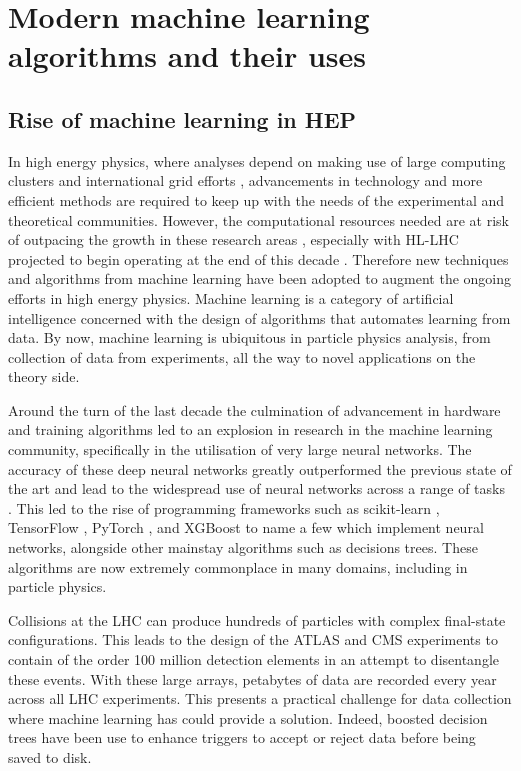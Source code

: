 \documentclass[main.tex]{subfiles}
\begin{document}
\chapter{Modern machine learning algorithms and their uses}
\label{chapter:ml}
\section{Rise of machine learning in HEP}
    In high energy physics, where analyses
    depend on making use of large computing clusters
    and international grid efforts \cite{WLCG}, advancements
    in technology and more efficient methods are
    required to keep up with the needs of the
    experimental and theoretical communities.
    However, the computational resources needed
    are at risk of outpacing the growth in these research
    areas \cite{Bothmann:2022thx}, especially with
    HL-LHC projected to begin operating at the end
    of this decade \cite{ZurbanoFernandez:2020cco}.
    Therefore new techniques and
    algorithms from machine learning 
    have been adopted to augment the ongoing efforts
    in high energy physics. Machine
    learning is a category of artificial intelligence
    concerned with the design of algorithms that
    automates learning from data.
    By now, machine learning is ubiquitous in
    particle physics analysis, from collection
    of data from experiments, all the way to novel
    applications on the theory side.

    Around the turn of the last decade the culmination
    of advancement in hardware and training algorithms
    led to an explosion in research in the
    machine learning community, specifically in the
    utilisation of very large neural networks. The accuracy
    of these deep neural networks greatly outperformed the
    previous state of the art \cite{NIPS2012_c399862d,russakovsky2015imagenet} and
    lead to the widespread use of neural networks across
    a range of tasks \cite{Schmidhuber_2015}.
    This led to the rise of programming
    frameworks such as scikit-learn \cite{scikit-learn},
    TensorFlow \cite{tensorflow2015-whitepaper},
    PyTorch \cite{paszke2019pytorch},
    and XGBoost \cite{Chen:2016:XST:2939672.2939785}
    to name a few which implement neural networks, alongside
    other mainstay algorithms such as decisions trees.
    These algorithms are now extremely commonplace
    in many domains, including in particle physics. 

    Collisions at the LHC can produce hundreds of
    particles with complex final-state configurations.
    This leads to the design of the ATLAS and CMS experiments
    to contain of the order 100 million detection elements
    in an attempt to disentangle these events. With these large
    arrays, petabytes of data are recorded every year
    across all LHC experiments.
    This presents a practical challenge for data
    collection where machine learning has could provide a solution.
    Indeed, boosted decision trees have been use
    to enhance triggers \cite{CMS:2020cmk} to accept or
    reject data before being saved to disk.
\end{document}
